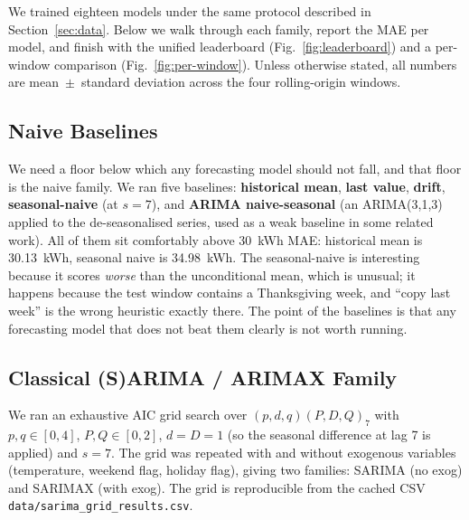 We trained eighteen models under the same protocol described in
Section~\ref{sec:data}. Below we walk through each family,
report the MAE per model, and finish with the unified leaderboard
(Fig.~\ref{fig:leaderboard}) and a per-window comparison
(Fig.~\ref{fig:per-window}). Unless otherwise stated, all numbers are
mean~$\pm$~standard deviation across the four rolling-origin windows.

\subsection{Naive Baselines}

We need a floor below which any forecasting model should not fall, and
that floor is the naive family. We ran five baselines:
\textbf{historical mean}, \textbf{last value}, \textbf{drift},
\textbf{seasonal-naive} (at $s=7$), and \textbf{ARIMA naive-seasonal}
(an ARIMA(3,1,3) applied to the de-seasonalised series, used as a
weak baseline in some related work). All of them sit comfortably
above 30~kWh MAE: historical mean is 30.13~kWh, seasonal naive is
34.98~kWh. The seasonal-naive is interesting because it scores
\emph{worse} than the unconditional mean, which is unusual; it
happens because the test window contains a Thanksgiving week, and
``copy last week'' is the wrong heuristic exactly there. The point of
the baselines is that any forecasting model that does not beat them
clearly is not worth running.

\subsection{Classical (S)ARIMA / ARIMAX Family}

We ran an exhaustive AIC grid search over $(p, d, q)(P, D, Q)_7$ with
$p, q \in [0, 4]$, $P, Q \in [0, 2]$, $d = D = 1$ (so the seasonal
difference at lag 7 is applied) and $s = 7$. The grid was repeated
with and without exogenous variables (temperature, weekend flag,
holiday flag), giving two families: SARIMA (no exog) and SARIMAX (with
exog). The grid is reproducible from the cached CSV
\texttt{data/sarima\_grid\_results.csv}.

